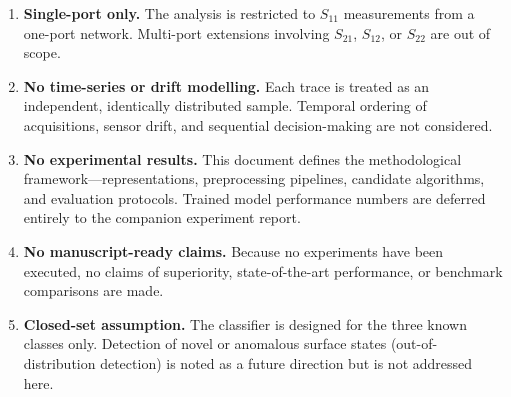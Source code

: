 \begin{enumerate}
    \item \textbf{Single-port only.}  The analysis is restricted to
        $S_{11}$ measurements from a one-port network.  Multi-port
        extensions involving $S_{21}$, $S_{12}$, or $S_{22}$ are out of
        scope.
    \item \textbf{No time-series or drift modelling.}  Each trace is
        treated as an independent, identically distributed sample.
        Temporal ordering of acquisitions, sensor drift, and sequential
        decision-making are not considered.
    \item \textbf{No experimental results.}  This document defines the
        methodological framework—representations, preprocessing
        pipelines, candidate algorithms, and evaluation protocols.
        Trained model performance numbers are deferred entirely to the
        companion experiment report.
    \item \textbf{No manuscript-ready claims.}  Because no experiments
        have been executed, no claims of superiority, state-of-the-art
        performance, or benchmark comparisons are made.
    \item \textbf{Closed-set assumption.}  The classifier is designed for
        the three known classes only.  Detection of novel or anomalous
        surface states (out-of-distribution detection) is noted as a
        future direction but is not addressed here.
\end{enumerate}
